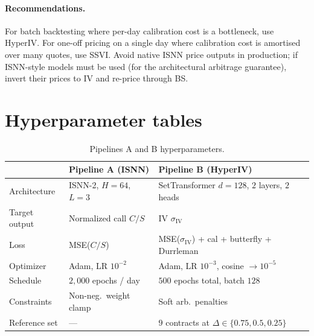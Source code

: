 \documentclass[11pt,a4paper]{article}
\newcommand{\iv}{\sigma_{\mathrm{IV}}}
\begin{document}
\paragraph{Recommendations.}
For batch backtesting where per-day calibration cost is a bottleneck, use
HyperIV. For one-off pricing on a single day where calibration cost is
amortised over many quotes, use SSVI. Avoid native ISNN price outputs in
production; if ISNN-style models must be used (for the architectural
arbitrage guarantee), invert their prices to IV and re-price through BS.




\appendix

\section{Hyperparameter tables}
\label{app:hp}

\begin{table}[H]
\centering
\small
\begin{tabular}{lll}
\toprule
& Pipeline A (ISNN) & Pipeline B (HyperIV) \\
\midrule
Architecture          & ISNN-2, $H{=}64$, $L{=}3$               & SetTransformer $d{=}128$, $2$ layers, $2$ heads \\
Target output         & Normalized call $C/S$                  & IV $\iv$ \\
Loss                  & MSE($C/S$)                              & MSE($\iv$) + cal + butterfly + Durrleman \\
Optimizer             & Adam, LR $10^{-2}$                      & Adam, LR $10^{-3}$, cosine $\to 10^{-5}$ \\
Schedule              & $2{,}000$ epochs / day                  & $500$ epochs total, batch $128$ \\
Constraints           & Non-neg.\ weight clamp                  & Soft arb.\ penalties \\
Reference set         & ---                                     & $9$ contracts at $\Delta {\in} \{0.75, 0.5, 0.25\}$ \\
\bottomrule
\end{tabular}
\caption{Pipelines A and B hyperparameters.}
\end{table}
\end{document}
